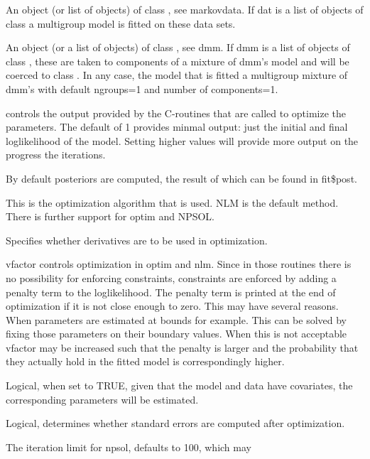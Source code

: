 \documentclass[a4paper]{book}
\begin{document}
\begin{Arguments}
\begin{ldescription}
\item[\code{dat}] An object (or list of objects) of class , see
markovdata.  If dat is a list of objects of class  a
multigroup model is fitted on these data sets.
\item[\code{dmm}] An object (or a list of objects) of class , see
dmm.  If dmm is a list of objects of class , these are taken
to components of a mixture of dmm's model and will be coerced to class
.  In any case, the model that is fitted a multigroup
mixture of dmm's with default ngroups=1 and number of components=1.
\item[\code{printlevel}]  controls the output provided by the
C-routines that are called to optimize the parameters.  The default of
1 provides minmal output: just the initial and final loglikelihood of
the model.  Setting higher values will provide more output on the
progress the iterations.
\item[\code{post}] By default posteriors are computed, the result of which
can be found in fit\$post.
\item[\code{method}] This is the optimization algorithm that is used. NLM is the 
default method. There is further support for optim and NPSOL.
\item[\code{der}] Specifies whether derivatives are to be used in optimization.
\item[\code{vfactor}] vfactor controls optimization in optim and nlm. Since in 
those routines there is no possibility for enforcing constraints, 
constraints are enforced by adding a penalty term to the loglikelihood. 
The penalty term is printed at the end of optimization if it is not close
enough to zero. This may have several reasons. When parameters are 
estimated at bounds for example. This can be solved by fixing those 
parameters on their boundary values. When this is not acceptable vfactor 
may be increased such that the penalty is larger and the probability that 
they actually hold in the fitted model is correspondingly higher.
\item[\code{tdcov}] Logical, when set to TRUE, given that the model and data have 
covariates, the corresponding parameters will be estimated.
\item[\code{ses}] Logical, determines whether standard errors are computed after
optimization.
\item[\code{iterlim}] The iteration limit for npsol, defaults to 100, which may

\end{ldescription}
\end{Arguments}
\end{document}

